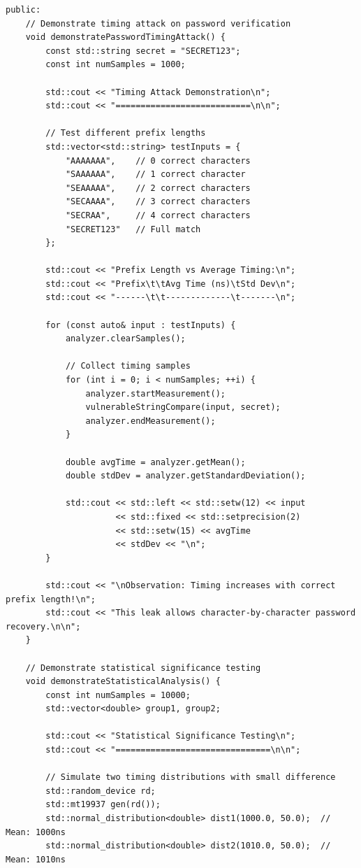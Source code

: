 \documentclass[12pt,a4paper]{article}
\theoremstyle{definition}
\begin{document}
\begin{lstlisting}[style=cryptoCode, caption={Timing Attack Simulation Framework}]
public:
    // Demonstrate timing attack on password verification
    void demonstratePasswordTimingAttack() {
        const std::string secret = "SECRET123";
        const int numSamples = 1000;
        
        std::cout << "Timing Attack Demonstration\n";
        std::cout << "===========================\n\n";
        
        // Test different prefix lengths
        std::vector<std::string> testInputs = {
            "AAAAAAA",    // 0 correct characters
            "SAAAAAA",    // 1 correct character
            "SEAAAAA",    // 2 correct characters
            "SECAAAA",    // 3 correct characters
            "SECRAA",     // 4 correct characters
            "SECRET123"   // Full match
        };
        
        std::cout << "Prefix Length vs Average Timing:\n";
        std::cout << "Prefix\t\tAvg Time (ns)\tStd Dev\n";
        std::cout << "------\t\t-------------\t-------\n";
        
        for (const auto& input : testInputs) {
            analyzer.clearSamples();
            
            // Collect timing samples
            for (int i = 0; i < numSamples; ++i) {
                analyzer.startMeasurement();
                vulnerableStringCompare(input, secret);
                analyzer.endMeasurement();
            }
            
            double avgTime = analyzer.getMean();
            double stdDev = analyzer.getStandardDeviation();
            
            std::cout << std::left << std::setw(12) << input 
                      << std::fixed << std::setprecision(2)
                      << std::setw(15) << avgTime 
                      << stdDev << "\n";
        }
        
        std::cout << "\nObservation: Timing increases with correct prefix length!\n";
        std::cout << "This leak allows character-by-character password recovery.\n\n";
    }
    
    // Demonstrate statistical significance testing
    void demonstrateStatisticalAnalysis() {
        const int numSamples = 10000;
        std::vector<double> group1, group2;
        
        std::cout << "Statistical Significance Testing\n";
        std::cout << "===============================\n\n";
        
        // Simulate two timing distributions with small difference
        std::random_device rd;
        std::mt19937 gen(rd());
        std::normal_distribution<double> dist1(1000.0, 50.0);  // Mean: 1000ns
        std::normal_distribution<double> dist2(1010.0, 50.0);  // Mean: 1010ns
        

\end{lstlisting}
\end{document}
